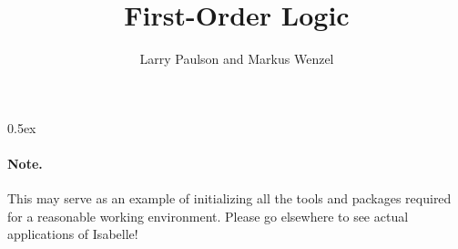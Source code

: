 \documentclass[11pt,a4paper]{article}
\begin{document}
\title{First-Order Logic}
\author{Larry Paulson and Markus Wenzel}
\maketitle

\tableofcontents

\parindent 0pt
\parskip 0.5ex

\paragraph{Note.} This may serve as an example of initializing all the tools
and packages required for a reasonable working environment.  Please go
elsewhere to see actual applications of Isabelle!



%
%
\end{document}
